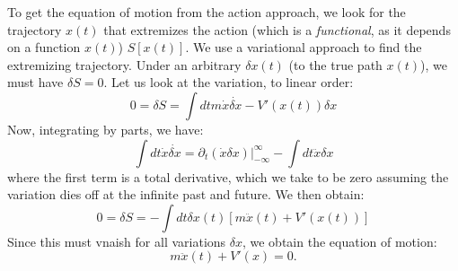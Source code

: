 To get the equation of motion from the action approach, we look for the trajectory $x(t)$ that extremizes the action (which is a \emph{functional}, as it depends on a function $x(t)$) $S[x(t)]$. We use a variational approach to find the extremizing trajectory. Under an arbitrary $\delta x(t)$ (to the true path $x(t)$), we must have $\delta S = 0$. Let us look at the variation, to linear order:
\begin{equation}
    0 = \delta S = \int dt m \dot{x}\dot{\delta x} - V'(x(t))\delta x
\end{equation}
Now, integrating by parts, we have:
\begin{equation}
    \int dt \dot{x}\dot{\delta x} = \left. \partial_t(\dot{x}\delta x) \right|_{-\infty}^\infty - \int dt \ddot{x}\delta x
\end{equation}
where the first term is a total derivative, which we take to be zero assuming the variation dies off at the infinite past and future. We then obtain:
\begin{equation}
    0 = \delta S = -\int dt \delta x(t)\left[m\ddot{x}(t) + V'(x(t))\right]
\end{equation}
Since this must vnaish for all variations $\delta x$, we obtain the equation of motion:
\begin{equation}
    \boxed{m\ddot{x}(t) + V'(x) = 0}.
\end{equation}

